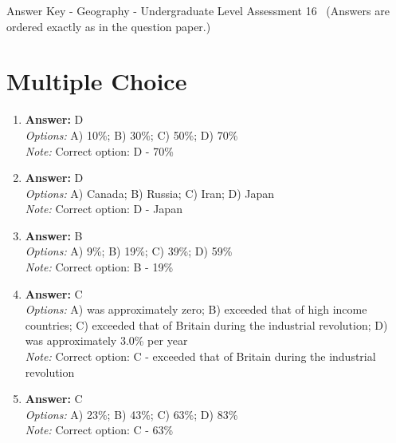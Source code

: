 \documentclass[12pt]{article}
\begin{document}
\begin{center}
Answer Key - Geography - Undergraduate Level Assessment 16 \
\small (Answers are ordered exactly as in the question paper.)
\end{center}

\section*{Multiple Choice}
\begin{enumerate}[label=\arabic*.]
\item \textbf{Answer:} D
\\ \textit{Options:} A) 10\%; B) 30\%; C) 50\%; D) 70\%
\\ \textit{Note:} Correct option: D - 70\%
\item \textbf{Answer:} D
\\ \textit{Options:} A) Canada; B) Russia; C) Iran; D) Japan
\\ \textit{Note:} Correct option: D - Japan
\item \textbf{Answer:} B
\\ \textit{Options:} A) 9\%; B) 19\%; C) 39\%; D) 59\%
\\ \textit{Note:} Correct option: B - 19\%
\item \textbf{Answer:} C
\\ \textit{Options:} A) was approximately zero; B) exceeded that of high income countries; C) exceeded that of Britain during the industrial revolution; D) was approximately 3.0\% per year
\\ \textit{Note:} Correct option: C - exceeded that of Britain during the industrial revolution
\item \textbf{Answer:} C
\\ \textit{Options:} A) 23\%; B) 43\%; C) 63\%; D) 83\%
\\ \textit{Note:} Correct option: C - 63\%
\end{enumerate}
\end{document}
